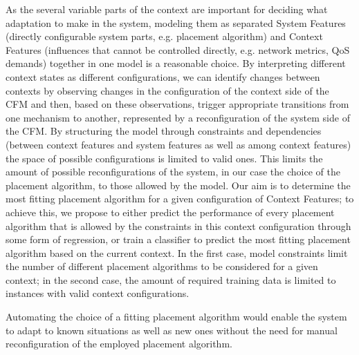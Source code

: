  As the several variable parts of the context are important for deciding what adaptation to make in the system, modeling them as separated System Features (directly configurable system parts, e.g. placement algorithm) and Context Features (influences that cannot be controlled directly, e.g. network metrics, QoS demands) together in one model is a reasonable choice.
 By interpreting different context states as different configurations, we can identify changes between contexts by observing changes in the configuration of the context side of the CFM and then, based on these observations, trigger appropriate transitions from one mechanism to another, represented by a reconfiguration of the system side of the CFM. 
 By structuring the model through constraints and dependencies (between context features and system features as well as among context features) the space of possible configurations is limited to valid ones. This limits the amount of possible reconfigurations of the system, in our case the choice of the placement algorithm, to those allowed by the model.  
 Our aim is to determine the most fitting placement algorithm for a given configuration of Context Features; to achieve this, we propose to either predict the performance of every placement algorithm that is allowed by the constraints in this context configuration through some form of regression, or train a classifier to predict the most fitting placement algorithm based on the current context. 
 In the first case, model constraints limit the number of different placement algorithms to be considered for a given context; in the second case, the amount of required training data is limited to instances with valid context configurations.
 
 Automating the choice of a fitting placement algorithm would enable the system to adapt to known situations as well as new ones without the need for manual reconfiguration of the employed placement algorithm. \\ \\



